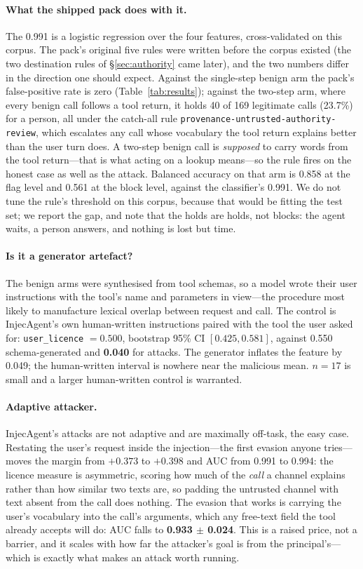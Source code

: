 \documentclass[sigconf,nonacm]{acmart}
\begin{document}
\paragraph{What the shipped pack does with it.}
The 0.991 is a logistic regression over the four features, cross-validated
on this corpus. The pack's original five rules were written before the corpus
existed (the two destination rules of \S\ref{sec:authority} came later), and the two numbers differ in the direction one should expect.
Against the single-step benign arm the pack's false-positive rate is zero
(Table~\ref{tab:results}); against the two-step arm, where every benign
call follows a tool return, it holds 40 of 169 legitimate calls
(23.7\%) for a person, all under the catch-all rule
\texttt{provenance-untrusted-authority-review}, which escalates any call
whose vocabulary the tool return explains better than the user turn does.
A two-step benign call is \emph{supposed} to carry words from the tool
return---that is what acting on a lookup means---so the rule fires on the
honest case as well as the attack. Balanced accuracy on that arm is 0.858
at the flag level and 0.561 at the block level, against the classifier's
0.991. We do not tune the rule's threshold on this corpus, because that
would be fitting the test set; we report the gap, and note that the
holds are holds, not blocks: the agent waits, a person answers, and
nothing is lost but time.

\paragraph{Is it a generator artefact?}
The benign arms were synthesised from tool schemas, so a model wrote
their user instructions with the tool's name and parameters in view---the
procedure most likely to manufacture lexical overlap between request and
call. The control is InjecAgent's own human-written instructions paired
with the tool the user asked for: \texttt{user\_licence} $=0.500$,
bootstrap 95\% CI $[0.425, 0.581]$, against 0.550 schema-generated and
\textbf{0.040} for attacks. The generator inflates the feature by 0.049;
the human-written interval is nowhere near the malicious mean. $n=17$ is
small and a larger human-written control is warranted.

\paragraph{Adaptive attacker.}
InjecAgent's attacks are not adaptive and are maximally off-task, the
easy case. Restating the user's request inside the injection---the first
evasion anyone tries---moves the margin from $+0.373$ to $+0.398$ and AUC
from 0.991 to 0.994: the licence measure is asymmetric, scoring how much
of the \emph{call} a channel explains rather than how similar two texts
are, so padding the untrusted channel with text absent from the call does
nothing. The evasion that works is carrying the user's vocabulary into
the call's arguments, which any free-text field the tool already accepts
will do: AUC falls to \textbf{0.933 $\pm$ 0.024}. This is a raised price,
not a barrier, and it scales with how far the attacker's goal is from the
principal's---which is exactly what makes an attack worth running.
\end{document}
